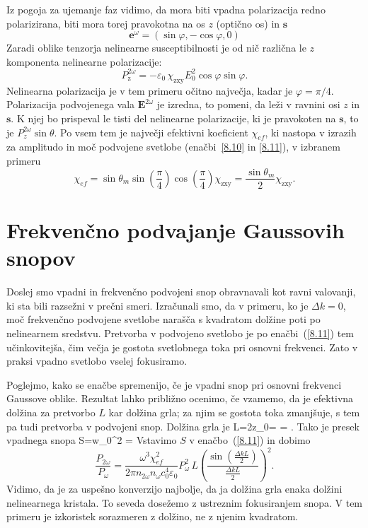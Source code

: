 \documentclass[11pt,fleqn]{book} %
\begin{document}
Iz pogoja za ujemanje faz vidimo, da mora biti vpadna polarizacija redno polarizirana, 
biti mora torej pravokotna na os $z$ (optično os) in $\mathbf{s}$
\begin{equation}
\mathbf{e}^{\omega}=(\sin\varphi,-\cos\varphi,0)
\label{8.15}
\end{equation}
Zaradi oblike tenzorja nelinearne susceptibilnosti je od nič različna
le $z$ komponenta nelinearne polarizacije: 
\begin{equation}
P_{\textrm{z}}^{2\omega}=- \varepsilon_0\, \chi_{\textrm{zxy}}E_{0}^2\cos\varphi\sin\varphi.
\label{8.151}
\end{equation}
Nelinearna polarizacija je v tem primeru očitno največja, kadar je $\varphi=\pi/4$.
Polarizacija podvojenega vala $\mathbf{E}^{2\omega}$ je izredna, to pomeni, da
leži v ravnini osi $z$ in $\mathbf{s}$. K njej bo prispeval le tisti
del nelinearne polarizacije, ki je pravokoten na $\mathbf{s}$, to je
$P_{z}^{2\omega}\sin\theta$. Po vsem tem je največji efektivni koeficient
$\chi_{ef}$, ki nastopa v izrazih za amplitudo in moč podvojene svetlobe
(enačbi~\ref{8.10} in \ref{8.11}), v izbranem primeru 
\begin{equation}
\chi_{ef}= \sin\theta_m \sin \left(\frac{\pi}{4}\right) \cos 
\left(\frac{\pi}{4}\right) \chi_{\textrm{zxy}} = \frac{\sin\theta_m}{2}\chi_{\textrm{zxy}}.
\label{8.16}
\end{equation}

\section{Frekvenčno podvajanje Gaussovih snopov}

Doslej smo vpadni in frekvenčno podvojeni snop obravnavali kot ravni valovanji,
ki sta bili razsežni v prečni smeri. Izračunali smo, da v primeru, ko je $\Delta k=0$,
moč frekvenčno podvojene svetlobe narašča s kvadratom dolžine poti po nelinearnem
sredstvu. Pretvorba v podvojeno svetlobo je po enačbi~(\ref{8.11}) tem
učinkovitejša, čim večja je gostota svetlobnega toka pri osnovni frekvenci.
Zato v praksi vpadno svetlobo vselej fokusiramo.  


Poglejmo, kako se enačbe spremenijo, če je vpadni snop pri osnovni 
frekvenci Gaussove oblike. Rezultat lahko približno ocenimo, če vzamemo, da je
efektivna dolžina za pretvorbo $L$ kar dolžina grla; za njim se
gostota toka zmanjšuje, s tem pa tudi pretvorba v podvojeni snop.
Dolžina grla je 
\beq
L=2z_{0}= = .
\eeq
Tako je presek vpadnega snopa
\beq
S=\pi w_{0}^{2} = 
\eeq
Vstavimo $S$ v enačbo~(\ref{8.11}) in dobimo 
\begin{equation}
\frac{P_{2\omega}}{P_{\omega}}=
\frac{\omega^3 \chi_{ef}^2}{2 \pi n_{2\omega} n_\omega c_0^4\varepsilon_0} P_\omega^2\, L
\left(\frac{\sin\left(\frac{\Delta k L}{2}\right)}{\frac{\Delta kL}{2}}\right)^2.
\label{8.17}
\end{equation}
Vidimo, da je za uspešno konverzijo najbolje, da ja dolžina grla
enaka dolžini nelinearnega kristala. To seveda dosežemo z ustreznim
fokusiranjem snopa. V tem primeru je izkoristek sorazmeren z dolžino,
ne z njenim kvadratom.\\
\end{document}
